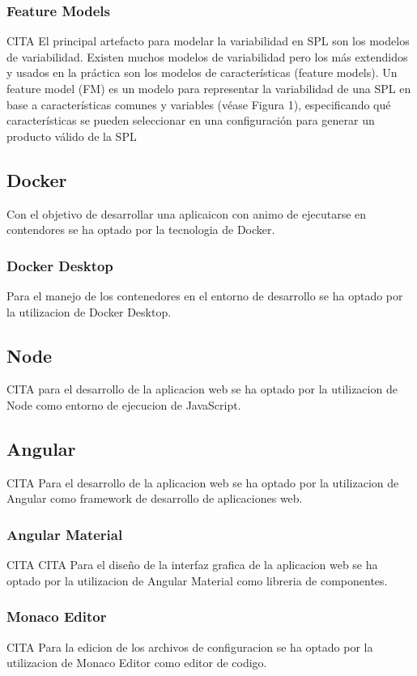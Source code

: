\documentclass[12pt, a4paper, twoside]{article}
\begin{document}
\subsubsection{Feature Models}
CITA 
El principal artefacto para modelar la variabilidad en SPL son los modelos de variabilidad. Existen muchos modelos 
de variabilidad pero los más extendidos y usados en la práctica son los modelos de características (feature models). 
Un feature model (FM) es un modelo para representar la variabilidad de una SPL en base a características comunes y 
variables (véase Figura 1), especificando qué características se pueden seleccionar en una configuración para generar 
un producto válido de la SPL
\subsection{Docker}
Con el objetivo de desarrollar una aplicaicon con animo de ejecutarse en contendores se ha optado por la tecnologia de Docker.
\subsubsection{Docker Desktop}
Para el manejo de los contenedores en el entorno de desarrollo se ha optado por la utilizacion de Docker Desktop.

\subsection{Node}
CITA
para el desarrollo de la aplicacion web se ha optado por la utilizacion de Node como entorno de ejecucion de JavaScript.
\subsection{Angular}
CITA
Para el desarrollo de la aplicacion web se ha optado por la utilizacion de Angular como framework de desarrollo de aplicaciones web.
\subsubsection{Angular Material}
CITA
CITA Para el diseño de la interfaz grafica de la aplicacion web se ha optado por la utilizacion de Angular Material como libreria de componentes.
\subsubsection{Monaco Editor}
CITA Para la edicion de los archivos de configuracion se ha optado por la utilizacion de Monaco Editor como editor de codigo.
\end{document}
